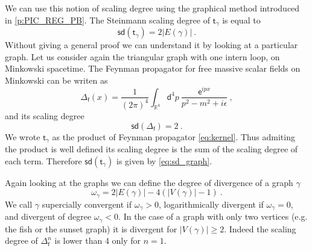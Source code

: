 \documentclass[11pt]{book}
\newcommand{\sd}{\mathsf{sd}}
\newcommand{\abs}[1]{\left|#1\right|}
\newcommand{\Rbb}{\mathbb{R}}
\newcommand{\dsf}{\mathsf{d}}
\newcommand{\esf}{\mathsf{e}}
\newcommand{\fsf}{\mathsf{f}}
\newcommand{\tsf}{\mathsf{t}}
\theoremstyle{break}
\begin{document}
\bigskip


We can use this notion of scaling degree using the graphical method introduced in \ref{p:PIC_REG_PB}. The Steinmann scaling degree of $\tsf_\gamma$ is equal to 
%
\begin{equation}
\sd(\tsf_\gamma) = 2 \abs{E(\gamma)} \ . 
\label{eq:sd_graph}
\end{equation}
%
Without giving a general proof we can understand it by looking at a particular graph. Let us consider again the triangular graph with one intern loop, on Minkowski spacetime. The Feynman propagator for free massive scalar fields on Minkowski can be writen as
%
\begin{equation*}
\Delta_\fsf(x) = \frac{1}{\left(2\pi\right)^4} \int_{\Rbb^4} \dsf^4p \ \frac{\esf^{ipx}}{p^2 - m^2 + i \epsilon} \ ,
\end{equation*}
%
and its scaling degree 
%
\begin{equation*}
\sd(\Delta_\fsf) = 2 \ .
\end{equation*}
%
We wrote $\tsf_\gamma$ as the product of Feynman propagator \eqref{eq:kernel}. Thus admiting the product is well defined its scaling degree is the sum of the scaling degree of each term. Therefore $\sd(\tsf_\gamma)$ is given by \eqref{eq:sd_graph}. 


\begin{figure}
\end{figure}


Again looking at the graphs we can define the degree of divergence of a graph $\gamma$ 
%
\begin{equation*}
\omega_\gamma = 2 \abs{E(\gamma)} - 4(\abs{V(\gamma)} - 1) \ .
\end{equation*}
%
We call $\gamma$ supercially convergent if $\omega_\gamma  > 0$, logarithmically divergent if $\omega_\gamma = 0$, and divergent of degree $\omega_\gamma < 0$. In the case of a graph with only two vertices (e.g. the fish or the sunset graph) it is divergent for $\abs{V(\gamma)} \geq 2$. Indeed the scaling degree of $\Delta_\fsf^n$ is lower than $4$ only for $n=1$.


\end{document}
